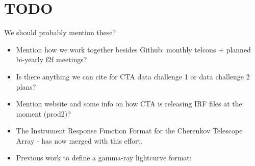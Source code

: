 \section{TODO}

We should probably mention these?

\begin{itemize}
    \item{} Mention how we work together besides Github: monthly telcons + planned bi-yearly f2f meetings?
    \item{} Is there anything we can cite for CTA data challenge 1 or data challenge 2 plans?
    \item{} Mention website and some info on how CTA is releasing IRF files at the moment (prod2)?
    \item{} The Instrument Response Function Format for the Cherenkov Telescope Array \cite{2015arXiv150807437W}
    - has now merged with this effort.
    \item{} Previous work to define a gamma-ray lightcurve format: \cite{2010AnA...524A..48T}
\end{itemize}
